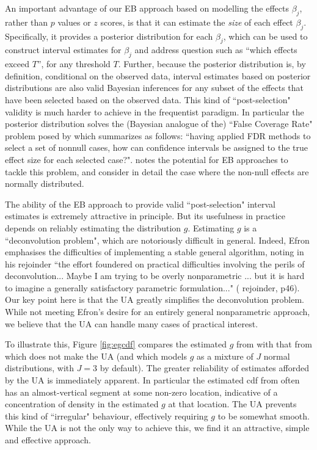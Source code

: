 An important advantage of our EB approach based on modelling the effects $\beta_j$, rather than $p$ values or $z$ scores, is that it
can estimate the {\it size} of each effect $\beta_j$.
Specifically, it provides a posterior distribution for each $\beta_j$, which can be used
to construct interval estimates for $\beta_j$ and address question such as ``which effects exceed $T$'', for any 
threshold $T$.
Further, because the posterior distribution is, by definition,
conditional on the observed data, interval estimates based on posterior distributions are also valid Bayesian inferences for any subset of the effects that have
been selected based on the observed data. This kind of ``post-selection" validity is much harder to achieve in the frequentist paradigm.
In particular the posterior distribution solves the (Bayesian analogue of the) ``False Coverage Rate" problem posed by
\cite{benjamini2005false} which \cite{efron2008microarrays} summarizes as follows: ``having applied FDR methods to select a set of nonnull cases,
how can confidence intervals be assigned to the true
effect size for each selected case?". \cite{efron2008microarrays} notes the potential for EB approaches to tackle this problem,
and \cite{zhao2012empirical} consider in detail the case where the non-null effects are normally distributed.

The ability of the EB approach to provide valid ``post-selection" interval estimates is extremely attractive in principle.
But its usefulness in practice
depends on reliably estimating the distribution $g$. Estimating $g$ is a ``deconvolution problem",
which are notoriously difficult in general. Indeed, Efron emphasises
the difficulties of implementing a stable general algorithm, noting in his rejoinder
``the effort foundered on practical difficulties involving the perils of deconvolution... Maybe I am trying
to be overly nonparametric ... but it is hard to imagine a
generally satisfactory parametric formulation..." (\cite{efron2008microarrays} rejoinder, p46).
Our key point here is that the UA greatly simplifies the deconvolution problem.
While not meeting Efron's desire for an entirely general nonparametric approach, we believe 
that the UA can handle many cases of practical interest.

To illustrate this, Figure \ref{fig:egcdf} compares the
estimated $g$ from \ashr  with that from \mixfdr which does not make the UA 
(and which models $g$ as a mixture of $J$ normal distributions, with $J=3$ by default).
The greater reliability of estimates afforded
by the UA is immediately apparent. In particular the estimated cdf from \mixfdr often has an almost-vertical
segment at some non-zero location, indicative of a concentration of density in the estimated $g$ at that location. 
The UA prevents this kind of ``irregular" behaviour, effectively requiring $g$ to be somewhat smooth.
While the UA is not the only way to achieve this, we find it an attractive, simple and effective approach.

